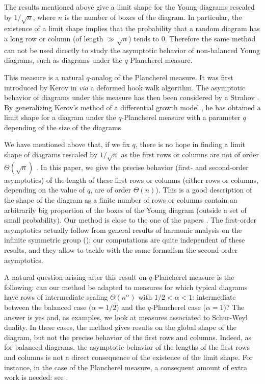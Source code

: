 \documentclass[10pt]{amsart}
\theoremstyle{remark}
\begin{document}
The results mentioned above give a limit shape for the Young diagrams rescaled by $1/\sqrt{n}$,  where $n$ is the number of boxes of the diagram. In particular, the existence of a limit shape implies that the probability that a random diagram has a long row or column (of length $\gg \sqrt{n}$) tends to $0$. Therefore the same method can not be used directly to study the asymptotic behavior of non-balanced Young diagrams, such as diagrams under the $q$-Plancherel measure.\bigskip

This measure is a natural $q$-analog of the Plancherel measure. It was first introduced by Kerov in \cite{KerovQHookWalk} {\it via} a deformed hook walk algorithm.
The asymptotic behavior of diagrams under this measure has then been considered by a Strahov \cite{Stra08}.
By generalizing Kerov's method of a differential growth model \cite{Kerov96}, he has obtained a limit shape for a diagram under the $q$-Plancherel measure with a parameter $q$ depending of the size of the diagrams.\bigskip

We have mentioned above that, if we fix $q$, there is no hope in finding a limit shape of diagrams rescaled by $1/\sqrt{n}$ as the first rows or columns are not of order  $\Theta(\sqrt{n})$ . In this paper, we give the precise behavior (first- and second-order asymptotics) of the length of these first rows or columns (either rows or columns, depending on the value of $q$, are of order $\Theta(n)$). This is a good description of the shape of the diagram as a finite number of rows or columns contain an arbitrarily big proportion of the boxes of the Young diagram (outside a set of small probability). Our method is close to the one of the papers \cite{IO02,Sniady06}. The first-order asymptotics actually follow from general results of harmonic analysis on the infinite symmetric group (\cite{Tho64,KV81,KOO97,KOV04}); our computations are quite independent of these results, and they allow to tackle with the same formalism the second-order asymptotics.\bigskip

A natural question arising after this result on $q$-Plancherel measure is the following: can our method be adapted to measures for which typical diagrams have rows of intermediate scaling $\Theta(n^\alpha)$ with $1/2 < \alpha < 1$: intermediate between the balanced case ($\alpha=1/2$) and the $q$-Plancherel case ($\alpha=1$)? The answer is yes and, as examples, we look at measures associated to Schur-Weyl duality. In these cases, the method gives results on the global shape of the diagram, but not the precise behavior of the first rows and columns. Indeed, as for balanced diagrams, the asymptotic behavior of the lengths of the first rows and columns is not a direct consequence of the existence of the limit shape. For instance, in the case of the Plancherel measure, a consequent amount of extra work is needed: see \cite{BDJ99firstrow, BDJ99secondrow, Okounkov99, BOO00,JohanssonPlancherel}.\bigskip
\end{document}
